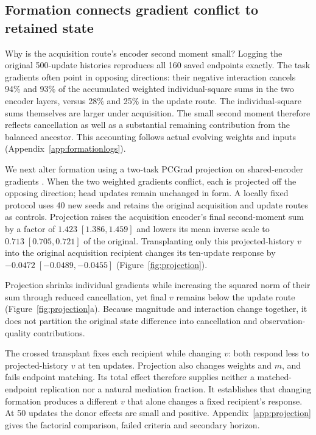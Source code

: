 \subsection{Formation connects gradient conflict to retained state}
\label{sec:forming}
Why is the acquisition route's encoder second moment small? Logging the original 500-update histories reproduces all 160 saved endpoints exactly. The task gradients often point in opposing directions: their negative interaction cancels 94\% and 93\% of the accumulated weighted individual-square sums in the two encoder layers, versus 28\% and 25\% in the update route. The individual-square sums themselves are larger under acquisition. The small second moment therefore reflects cancellation as well as a substantial remaining contribution from the balanced ancestor. This accounting follows actual evolving weights and inputs (Appendix~\ref{app:formationlogs}).

We next alter formation using a two-task PCGrad projection on shared-encoder gradients \citep{yu2020gradient}. When the two weighted gradients conflict, each is projected off the opposing direction; head updates remain unchanged in form. A locally fixed protocol uses 40 new seeds and retains the original acquisition and update routes as controls. Projection raises the acquisition encoder's final second-moment sum by a factor of $1.423\;[1.386,1.459]$ and lowers its mean inverse scale to $0.713\;[0.705,0.721]$ of the original. Transplanting only this projected-history $v$ into the original acquisition recipient changes its ten-update response by $-0.0472\;[-0.0489,-0.0455]$ (Figure~\ref{fig:projection}).

Projection shrinks individual gradients while increasing the squared norm of their sum through reduced cancellation, yet final $v$ remains below the update route (Figure~\ref{fig:projection}a). Because magnitude and interaction change together, it does not partition the original state difference into cancellation and observation-quality contributions.

The crossed transplant fixes each recipient while changing $v$: both respond less to projected-history $v$ at ten updates. Projection also changes weights and $m$, and fails endpoint matching. Its total effect therefore supplies neither a matched-endpoint replication nor a natural mediation fraction. It establishes that changing formation produces a different $v$ that alone changes a fixed recipient's response. At 50 updates the donor effects are small and positive. Appendix~\ref{app:projection} gives the factorial comparison, failed criteria and secondary horizon.

